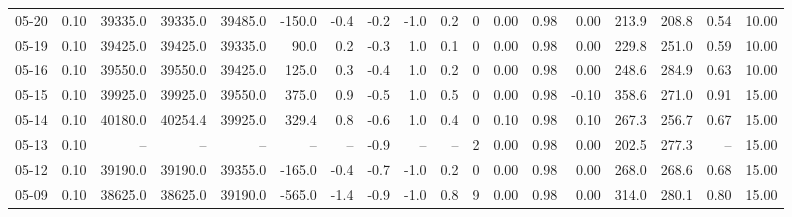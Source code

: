 \begin{threeparttable}
{\begin{tabular}{lrrrrrrrrrrrrrrrrr}
  05-20 &     0.10 & 39335.0 & 39335.0 & 39485.0 &     -150.0 &           -0.4 &                      -0.2 &                     -1.0 &                 0.2 &              0 &       0.00 &      0.98 &           0.00 &            213.9 &               208.8 &            0.54 &                  10.00 \\
  05-19 &     0.10 & 39425.0 & 39425.0 & 39335.0 &       90.0 &            0.2 &                      -0.3 &                      1.0 &                 0.1 &              0 &       0.00 &      0.98 &           0.00 &            229.8 &               251.0 &            0.59 &                  10.00 \\
  05-16 &     0.10 & 39550.0 & 39550.0 & 39425.0 &      125.0 &            0.3 &                      -0.4 &                      1.0 &                 0.2 &              0 &       0.00 &      0.98 &           0.00 &            248.6 &               284.9 &            0.63 &                  10.00 \\
  05-15 &     0.10 & 39925.0 & 39925.0 & 39550.0 &      375.0 &            0.9 &                      -0.5 &                      1.0 &                 0.5 &              0 &       0.00 &      0.98 &          -0.10 &            358.6 &               271.0 &            0.91 &                  15.00 \\
  05-14 &     0.10 & 40180.0 & 40254.4 & 39925.0 &      329.4 &            0.8 &                      -0.6 &                      1.0 &                 0.4 &              0 &       0.10 &      0.98 &           0.10 &            267.3 &               256.7 &            0.67 &                  15.00 \\
  05-13 &     0.10 &      -- &      -- &      -- &         -- &             -- &                      -0.9 &                       -- &                  -- &              2 &       0.00 &      0.98 &           0.00 &            202.5 &               277.3 &              -- &                  15.00 \\
  05-12 &     0.10 & 39190.0 & 39190.0 & 39355.0 &     -165.0 &           -0.4 &                      -0.7 &                     -1.0 &                 0.2 &              0 &       0.00 &      0.98 &           0.00 &            268.0 &               268.6 &            0.68 &                  15.00 \\
  05-09 &     0.10 & 38625.0 & 38625.0 & 39190.0 &     -565.0 &           -1.4 &                      -0.9 &                     -1.0 &                 0.8 &              9 &       0.00 &      0.98 &           0.00 &            314.0 &               280.1 &            0.80 &                  15.00 \\

\end{tabular}}
\end{threeparttable}
